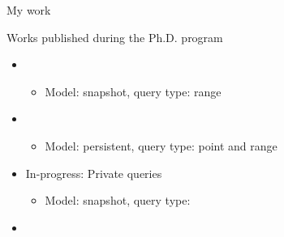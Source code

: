 	\begin{frame}{My work}

		\begin{block}{Works published during the Ph.D. program}

			\vspace*{-1ex}

			\begin{itemize}[label={}]
				\only<4->{
					\setlength\itemsep{-1ex}
				}

				\item<1> 

					\begin{itemize}[label={}]
						\item \small Model: \alert{snapshot}, query type: \alert{range} \normalsize
					\end{itemize}

				\item<2> 

					\begin{itemize}[label={}]
						\item \small Model: \alert{persistent}, query type: \alert{point} and \alert{range} \normalsize
					\end{itemize}

				\item<3> In-progress: Private \knn{} queries

					\begin{itemize}[label={}]
						\item \small Model: \alert{snapshot}, query type: \alert{\knn{}} \normalsize
					\end{itemize}

				\item {}

			\end{itemize}

		\end{block}

	\end{frame}
